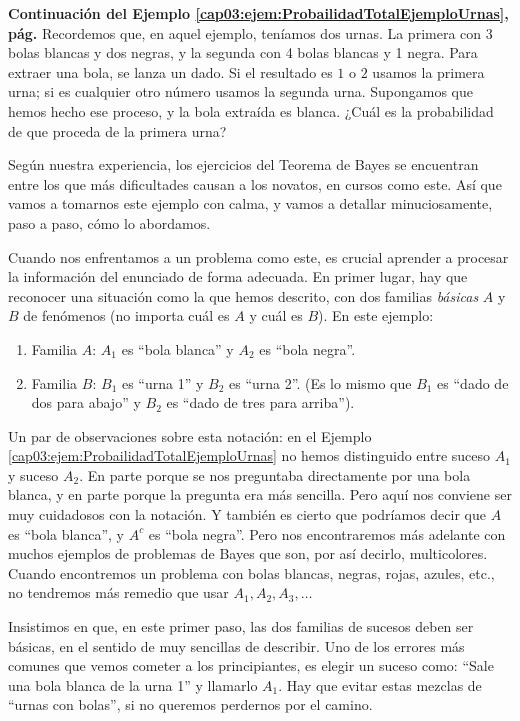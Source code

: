 \begin{Ejemplo}
    {\bf Continuación del Ejemplo \ref{cap03:ejem:ProbailidadTotalEjemploUrnas}, pág. \pageref{cap03:ejem:ProbailidadTotalEjemploUrnas}}\label{cap03:ejem:EjemploUrnasBayes}
    Recordemos que, en aquel ejemplo, teníamos dos urnas. La primera con 3 bolas blancas y dos negras, y la segunda con 4 bolas blancas y 1 negra. Para extraer una bola, se lanza un dado. Si el resultado es $1$ o $2$ usamos la primera urna; si es cualquier otro número usamos la segunda urna.
    Supongamos que hemos hecho ese proceso, y la bola extraída es blanca. ¿Cuál es la probabilidad de que proceda de la primera urna?

    Según nuestra experiencia, los ejercicios del Teorema de Bayes se encuentran entre los que más dificultades causan a los novatos, en cursos como este. Así que vamos a tomarnos este ejemplo con calma, y vamos a detallar minuciosamente, paso a paso, cómo lo abordamos.

    Cuando nos enfrentamos a un problema como este, es crucial aprender a procesar la información del enunciado de forma adecuada. En primer lugar, hay que reconocer una situación como la que hemos descrito, con dos familias {\em básicas} $A$ y $B$ de fenómenos (no importa cuál es $A$ y cuál es $B$). En este ejemplo:
    \begin{enumerate}
    \item Familia $A$: $A_1$ es ``bola blanca'' y $A_2$ es ``bola negra''.
    \item Familia $B$: $B_1$ es ``urna 1'' y $B_2$ es ``urna 2''. (Es lo mismo que $B_1$ es ``dado de dos para abajo'' y $B_2$ es ``dado de tres para arriba'').
    \end{enumerate}
    Un par de observaciones sobre esta notación: en el Ejemplo \ref{cap03:ejem:ProbailidadTotalEjemploUrnas} no hemos distinguido entre suceso $A_1$ y suceso $A_2$. En parte porque se nos preguntaba directamente por una bola blanca, y en parte porque la pregunta era más sencilla. Pero aquí nos conviene ser muy cuidadosos con la notación. Y también es cierto que podríamos decir que $A$ es ``bola blanca'', y $A^c$ es ``bola negra''. Pero nos encontraremos más adelante con muchos ejemplos de problemas de Bayes que son, por así decirlo, multicolores. Cuando encontremos un problema con bolas blancas, negras, rojas, azules, etc., no tendremos más remedio que usar $A_1, A_2, A_3,\ldots$

    Insistimos en que, en este primer paso, las dos familias de sucesos deben ser básicas, en el sentido de muy sencillas de describir. Uno de los errores más comunes que vemos cometer a los principiantes, es elegir un suceso como:
    ``Sale una bola blanca de la urna 1''
    y llamarlo $A_1$. Hay que evitar estas mezclas de ``urnas con bolas'', si no queremos perdernos por el camino.


\end{Ejemplo}
